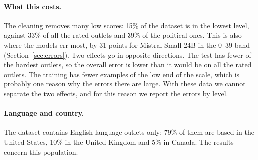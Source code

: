 \documentclass[11pt,a4paper]{article}
\begin{document}
\paragraph{What this costs.} The cleaning removes many low scores: 15\% of the dataset is in the lowest level, against
33\% of all the rated outlets and 39\% of the political ones. This is also where the models err most, by 31 points for
Mistral-Small-24B in the 0--39 band (Section~\ref{sec:errors}). Two effects go in opposite directions. The test has
fewer of the hardest outlets, so the overall error is lower than it would be on all the rated outlets. The training has
fewer examples of the low end of the scale, which is probably one reason why the errors there are large. With these
data we cannot separate the two effects, and for this reason we report the errors by level.

\paragraph{Language and country.} The dataset contains English-language outlets only: 79\% of them are based in the
United States, 10\% in the United Kingdom and 5\% in Canada. The results concern this population.

\begin{table}[h]
\centering
\caption{The dataset and NewsGuard. Each row is a set of outlets; the columns give their number, their mean and median
NewsGuard score, and their shares (\%) by level and by country (other: other countries or international).}\label{tab:population}
\end{table}
\end{document}
